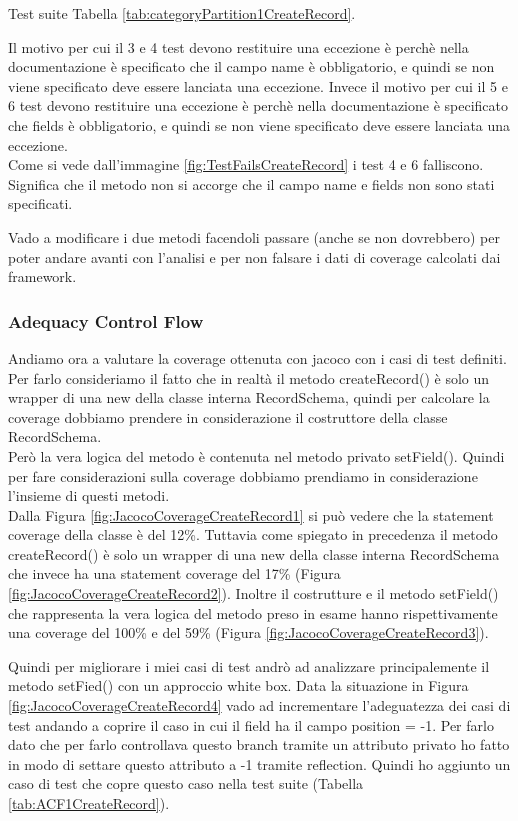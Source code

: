 \documentclass[12pt, a4paper]{article}
\begin{document}
Test suite Tabella \ref{tab:categoryPartition1CreateRecord}.

Il motivo per cui il 3 e 4 test devono restituire una eccezione è perchè nella documentazione è specificato che
il campo name è obbligatorio, e quindi se non viene specificato deve essere lanciata una eccezione.
Invece il motivo per cui il 5 e 6 test devono restituire una eccezione è perchè nella documentazione è specificato che
fields è obbligatorio, e quindi se non viene specificato deve essere lanciata una eccezione. \\

Come si vede dall'immagine \ref{fig:TestFailsCreateRecord} i test 4 e 6 falliscono. Significa che il metodo non si accorge
che il campo name e fields non sono stati specificati. 

Vado a modificare i due metodi facendoli passare (anche se non dovrebbero) per poter andare avanti con l'analisi e 
per non falsare i dati di coverage calcolati dai framework.

\subsubsection{Adequacy Control Flow}

Andiamo ora a valutare la coverage ottenuta con jacoco con i casi di test definiti. Per farlo consideriamo il fatto
che in realtà il metodo createRecord() è solo un wrapper di una new della classe interna RecordSchema, quindi per calcolare
la coverage dobbiamo prendere in considerazione il costruttore della classe RecordSchema. \\ Però la vera logica del metodo
è contenuta nel metodo privato setField(). Quindi per fare considerazioni sulla coverage dobbiamo prendiamo in considerazione 
l'insieme di questi metodi. \\
Dalla Figura \ref{fig:JacocoCoverageCreateRecord1} si può vedere che la statement coverage della classe è del 12\%. Tuttavia come 
spiegato in precedenza il metodo createRecord() è solo un wrapper di una new della classe interna RecordSchema che invece ha una
statement coverage del 17\% (Figura \ref{fig:JacocoCoverageCreateRecord2}). Inoltre il costrutture e il metodo setField() 
che rappresenta la vera logica del metodo preso in esame hanno rispettivamente una coverage del 100\% e del 59\% 
(Figura \ref{fig:JacocoCoverageCreateRecord3}).

Quindi per migliorare i miei casi di test andrò ad analizzare principalemente il metodo setFied() con un approccio white box.
Data la situazione in Figura \ref{fig:JacocoCoverageCreateRecord4} vado ad incrementare l'adeguatezza dei casi di test
andando a coprire il caso in cui il field ha il campo position = -1. Per farlo dato che per farlo controllava questo branch 
tramite un attributo privato ho fatto in modo di settare questo attributo a -1 tramite reflection.
Quindi ho aggiunto un caso di test che copre questo caso nella test suite (Tabella \ref{tab:ACF1CreateRecord}).
\end{document}

